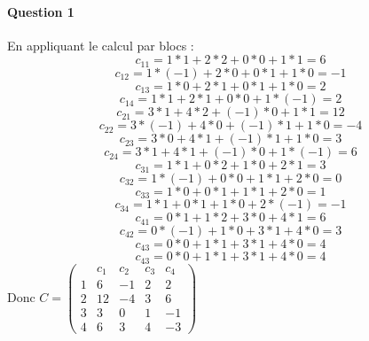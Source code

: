 \documentclass[a4paper,10pt,margin=2in]{report}
\begin{document}
\paragraph{Question 1}
En appliquant le calcul par blocs :
\begin{equation}
 c_{11} = 1 * 1 + 2 * 2 + 0 * 0 + 1 * 1 = 6
\end{equation}
\begin{equation}
 c_{12} = 1 * (-1) + 2 * 0 + 0 * 1 + 1 * 0 = -1
\end{equation}
\begin{equation}
c_{13} = 1 * 0 + 2 * 1 + 0 * 1 + 1 * 0 = 2
\end{equation}
\begin{equation}
c_{14} = 1 * 1 + 2 * 1 + 0 * 0 + 1 * (-1) = 2
\end{equation}
\begin{equation}
 c_{21} = 3 * 1 + 4 * 2 + (-1) * 0 + 1 * 1 = 12
\end{equation}
\begin{equation}
c_{22} = 3 * (-1) + 4 * 0 + (-1) * 1 + 1 * 0 = -4
\end{equation}
\begin{equation}
c_{23} = 3 * 0 + 4 * 1 + (-1) * 1 + 1 * 0 = 3
\end{equation}
\begin{equation}
c_{24} = 3 * 1 + 4 * 1 + (-1) * 0 + 1 * (-1) = 6
\end{equation}
\begin{equation}
c_{31} = 1 * 1 + 0 * 2 + 1 * 0 + 2 * 1 = 3
\end{equation}
\begin{equation}
c_{32} = 1 * (-1) + 0 * 0 + 1 * 1 + 2 * 0 = 0
\end{equation}
\begin{equation}
c_{33} = 1 * 0 + 0 * 1 + 1 * 1 + 2 * 0 = 1
\end{equation}
\begin{equation}
c_{34} = 1 * 1 + 0 * 1 + 1 * 0 + 2 * (-1) = -1
\end{equation}
\begin{equation}
c_{41} = 0 * 1 + 1 * 2 + 3 * 0 + 4 * 1 = 6
\end{equation}
\begin{equation}
c_{42} = 0 * (-1) + 1 * 0 + 3 * 1 + 4 * 0 = 3
\end{equation}
\begin{equation}
c_{43} = 0 * 0 + 1 * 1 + 3 * 1 + 4 * 0 = 4
\end{equation}
\begin{equation}
c_{43} = 0 * 0 + 1 * 1 + 3 * 1 + 4 * 0 = 4
\end{equation}
Donc 
\begin{math}
C = \begin{pmatrix}
  & c_1 & c_2 & c_3 & c_4 \\
1 & 6 & -1 & 2 & 2 \\
2 & 12 & -4 & 3 & 6 \\
3 & 3 & 0 & 1 & -1 \\
4 & 6 & 3 & 4 & -3
\end{pmatrix}
\end{math}
\end{document}
